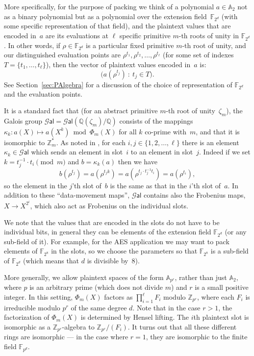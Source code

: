 \documentclass[14pt]{extarticle}
\newcommand{\secref}[1]{Section~\protect\ref{sec:#1}}
\newcommand{\A}{\mathbb{A}}
\newcommand{\F}{\mathbb{F}}
\newcommand{\Q}{\mathbb{Q}}
\newcommand{\Z}{\mathbb{Z}}
\newcommand{\Gal}{\mathcal{G}\mathsf{al}}
\begin{document}
More specifically, for the purpose of packing we think of a
polynomial $a\in\A_2$ not as a binary polynomial but as a
polynomial over the extension field~$\F_{2^d}$ (with some specific
representation of that field), and the plaintext values that are
encoded in~$a$ are its evaluations at $\ell$ specific primitive
$m$-th roots of unity in $\F_{2^d}$.
In other words, if $\rho\in\F_{2^d}$ is a
particular fixed primitive $m$-th root of unity, and our distinguished
evaluation points are $\rho^{t_1},\rho^{t_2},\ldots,\rho^{t_{\ell}}$
(for some set of indexes $T=\{t_1,\ldots,t_\ell\}$), then the vector
of plaintext values encoded in~$a$ is:
\[
\big(a(\rho^{t_j})~:~ t_j \in T\big).
\]
See \secref{PAlgebra} for a discussion of the choice of representation
of $\F_{2^d}$ and the evaluation points.

It is a standard fact that (for an abstract primitive $m$-th root of
unity~$\zeta_m$), the Galois group $\Gal=\Gal(\Q(\zeta_m)/\Q)$
consists of the mappings $\kappa_k: a(X)\mapsto a(X^k)\bmod\Phi_m(X)$
for all $k$ co-prime with~$m$, and that it is isomorphic to $\Z_m^*$.
As noted in \cite{GHS12a}, for each $i,j\in\{1,2,\ldots,\ell\}$ there
is an element $\kappa_k\in\Gal$ which sends an element in slot~$i$ to
an element in slot~$j$. Indeed if we set $k=t_j^{-1}\cdot t_i\pmod m$
and $b = \kappa_k(a)$ then we have
\[
b(\rho^{t_j}) = a(\rho^{t_jk}) = a(\rho^{t_j\cdot t_j^{-1} t_i})
= a(\rho^{t_i}),
\]
so the element in the $j$'th slot of~$b$ is the same as that in the
$i$'th slot of~$a$.
In addition to these ``data-movement maps'', $\Gal$ contains also the
Frobenius maps, $X \longrightarrow X^{2^i}$, which also act as
Frobenius on the individual slots.

We note that the values that are encoded in the slots do not have to
be individual bits, in general they can be elements of the extension
field $\F_{2^d}$ (or any sub-field of it). For example, for the AES
application we may want to pack elements of $\F_{2^8}$ in the slots,
so we choose the parameters so that $\F_{2^8}$ is a sub-field of
$\F_{2^d}$ (which means that $d$ is divisible by~8).


More generally, we allow plaintext spaces of the form $\A_{p^r}$,
rather than just $\A_2$, where $p$ is an arbitrary prime (which does 
not divide $m$) and $r$ is a small positive integer.
In this setting, $\Phi_m(X)$ factors as $\prod_{i=1}^\ell F_i$
modulo $\Z_{p^r}$, where each $F_i$ is irreducible modulo $p^r$ 
of the same
degree $d$.
Note that in the case $r > 1$, the factorization of $\Phi_m(X)$
is determined by Hensel lifting.
The $i$th plaintext slot is isomorphic as a $\Z_{p^r}$-algebra to $\Z_{p^r}/(F_i)$.
It turns out that all these different rings are isomorphic ---
in the case where $r = 1$, they are isomorphic to the
finite field $\F_{p^d}$.
\end{document}
